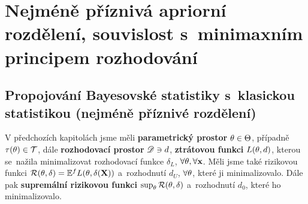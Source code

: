 \chapter{Nejméně příznivá apriorní rozdělení, souvislost s~minimaxním principem rozhodování}

\section{Propojování Bayesovské statistiky s~klasickou statistikou (nejméně příznivé rozdělení)}
V předchozích kapitolách jsme měli \textbf{parametrický prostor} $\theta\in\Theta$, případně $\tau(\theta)\in\mathcal{T}$, dále \textbf{rozhodovací prostor} $\mathscr{D}\ni d $, \textbf{ztrátovou funkci}  $L(\theta,d)$, kterou se~nažila minimalizovat rozhodovací funkce $\delta_L$, $\forall \theta,\forall \textbf{x}$. Měli jsme také rizikovou funkci $\mathcal{R}(\theta,\delta)=\mathbb{E}^fL(\theta,\delta(\textbf{X}))$ a~rozhodnutí $d_U$, $\forall\theta$, které ji minimalizovalo. Dále pak \textbf{supremální rizikovou funkci} $\sup_\theta\mathcal{R}(\theta,\delta)$ a~rozhodnutí $d_0$, které ho minimalizovalo. 


